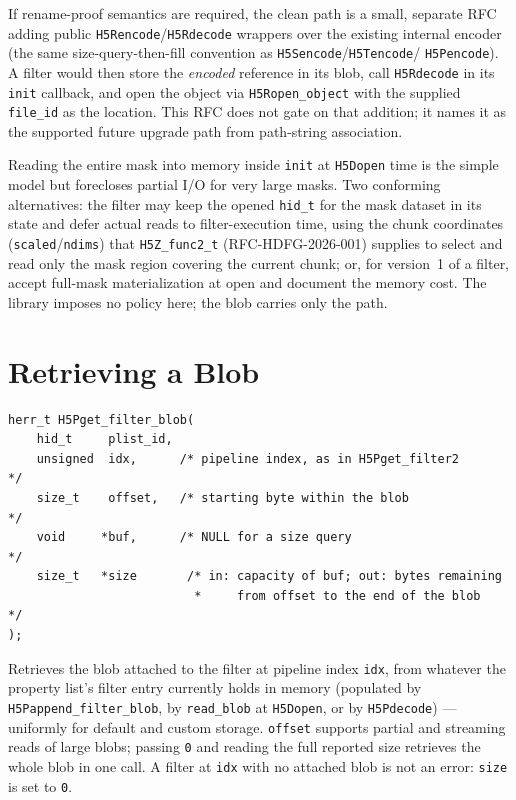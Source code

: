\documentclass[../RFC-HDFG-2026-003.tex]{subfiles}
\begin{document}
If rename-proof semantics are required, the clean path is a small,
separate RFC adding public \texttt{H5Rencode}/\texttt{H5Rdecode}
wrappers over the existing internal encoder (the same
size-query-then-fill convention as \texttt{H5Sencode}/\texttt{H5Tencode}/
\texttt{H5Pencode}). A filter would then store the \emph{encoded}
reference in its blob, call \texttt{H5Rdecode} in its \texttt{init}
callback, and open the object via \texttt{H5Ropen\_object} with the
supplied \texttt{file\_id} as the location. This RFC does not gate on that
addition; it names it as the supported future upgrade path from
path-string association.


Reading the entire mask into memory inside \texttt{init} at
\texttt{H5Dopen} time is the simple model but forecloses partial I/O
for very large masks. Two conforming alternatives: the filter may keep
the opened \texttt{hid\_t} for the mask dataset in its state and defer
actual reads to filter-execution time, using the chunk coordinates
(\texttt{scaled}/\texttt{ndims}) that \texttt{H5Z\_func2\_t}
(RFC-HDFG-2026-001) supplies to select and read only the mask region
covering the current chunk; or, for version~1 of a filter, accept
full-mask materialization at open and document the memory cost. The
library imposes no policy here; the blob carries only the path.


\section{Retrieving a Blob}
\label{sec:blob-getter}

\begin{verbatim}
herr_t H5Pget_filter_blob(
    hid_t     plist_id,
    unsigned  idx,      /* pipeline index, as in H5Pget_filter2         */
    size_t    offset,   /* starting byte within the blob                */
    void     *buf,      /* NULL for a size query                        */
    size_t   *size       /* in: capacity of buf; out: bytes remaining
                          *     from offset to the end of the blob      */
);
\end{verbatim}

Retrieves the blob attached to the filter at pipeline index
\texttt{idx}, from whatever the property list's filter entry currently
holds in memory (populated by \texttt{H5Pappend\_filter\_blob}, by
\texttt{read\_blob} at \texttt{H5Dopen}, or by \texttt{H5Pdecode}) ---
uniformly for default and custom storage. \texttt{offset} supports
partial and streaming reads of large blobs; passing \texttt{0} and
reading the full reported size retrieves the whole blob in one call. A
filter at \texttt{idx} with no attached blob is not an error:
\texttt{size} is set to \texttt{0}.
\end{document}

